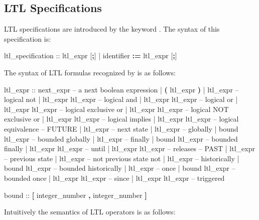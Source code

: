 \subsection{LTL Specifications}
\label{LTL Specifications}
%
LTL specifications are introduced by the keyword
.
%
The syntax of this specification is:
%
\begin{Grammar}
ltl_specification ::  ltl_expr [\textbf{;}]
                   |   identifier \textbf{:=} ltl_expr [\textbf{;}]
\end{Grammar}
%
The syntax of LTL formulas recognized by \nusmv is as follows:
\begin{Grammar}
ltl_expr ::
    next_expr              -- a next boolean expression
    | \textbf{(} ltl_expr \textbf{)}
    | \operator{!} ltl_expr             -- logical not
    | ltl_expr \operator{\&} ltl_expr    -- logical and
    | ltl_expr \operator{|} ltl_expr    -- logical or
    | ltl_expr  ltl_expr  -- logical exclusive or
    | ltl_expr  ltl_expr -- logical NOT exclusive or
    | ltl_expr \operator{->} ltl_expr   -- logical implies
    | ltl_expr \operator{<->} ltl_expr  -- logical equivalence
    -- FUTURE
    |  ltl_expr             -- next state
    |  ltl_expr             -- globally
    |  bound ltl_expr       -- bounded globally
    |  ltl_expr             -- finally
    |  bound ltl_expr       -- bounded finally
    | ltl_expr  ltl_expr    -- until
    | ltl_expr  ltl_expr    -- releases
    -- PAST
    |  ltl_expr             -- previous state
    |  ltl_expr             -- not previous state not
    |  ltl_expr             -- historically
    |  bound ltl_expr       -- bounded historically
    |  ltl_expr             -- once
    |  bound ltl_expr       -- bounded once
    | ltl_expr  ltl_expr    -- since
    | ltl_expr  ltl_expr    -- triggered

bound :: \textbf{[} integer_number \textbf{,} integer_number \textbf{]}
\end{Grammar}
%
Intuitively the semantics of LTL operators is as follows:
%
